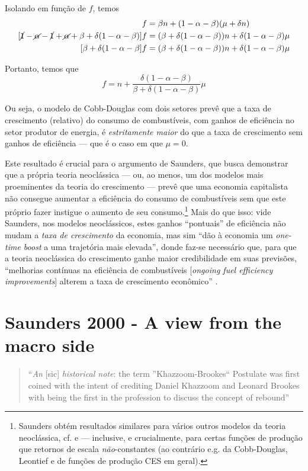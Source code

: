 Isolando em função de $f$, temos
\begin{align*}
[1 - \alpha - (1-\alpha-\beta)(1-\delta) ] f &= \beta n + (1-\alpha-\beta) (\mu + \delta n) \\
[\cancel{ 1 }-\cancel{ \alpha } - \cancel{ 1 }+\cancel{ \alpha }+\beta + \delta(1-\alpha-\beta)] f &= (\beta + \delta(1-\alpha-\beta)) n + \delta(1-\alpha-\beta) \mu \\
[\beta+\delta(1-\alpha-\beta] f &= (\beta + \delta(1-\alpha-\beta)) n + \delta(1-\alpha-\beta) \mu
\end{align*}

Portanto, temos que 
$$
f = n + \frac{\delta (1-\alpha-\beta)}{\beta+\delta(1-\alpha-\beta)} \mu
$$

Ou seja, o modelo de Cobb-Douglas com dois setores prevê que a taxa de crescimento (relativo) do consumo de combustíveis, com ganhos de eficiência no setor produtor de energia, é \textit{estritamente maior} do que a taxa de crescimento sem ganhos de eficiência — que é o caso em que $\mu=0$. 

Este resultado é crucial para o argumento de Saunders, que busca demonstrar que a própria teoria neoclássica — ou, ao menos, um dos modelos mais proeminentes da teoria do crescimento — prevê que uma economia capitalista não consegue aumentar a eficiência do consumo de combustíveis sem que este próprio fazer instigue o aumento de seu consumo.\footnote{Saunders obtém resultados similares para vários outros modelos da teoria neoclássica, cf. \textcite{Saunders2000} e \textcite{Saunders2008} — inclusive, e crucialmente, para certas funções de produção que retornos de escala \textit{não}-constantes (ao contrário e.g. da Cobb-Douglas, Leontief e de funções de produção CES em geral).} Mais do que isso: vide Saunders, nos modelos neoclássicos, estes ganhos ``pontuais'' de eficiência não mudam a \textit{taxa de crescimento} da economia, mas sim ``dão à economia um \textit{one-time boost} a uma trajetória mais elevada'', donde faz-se necessário que, para que a teoria neoclássica do crescimento ganhe maior credibilidade em suas previsões, ``melhorias contínuas na eficiência de combustíveis [\textit{ongoing fuel efficiency improvements}] alterem a taxa de crescimento econômico'' \parencite[p. 444]{Saunders2000}.

\section{Saunders 2000 - A view from the macro side}
\begin{quote}
``\textit{An} [sic] \textit{historical note}: the term ''Khazzoom-Brookes`` Postulate was first coined with the intent of crediting Daniel Khazzoom and Leonard Brookes with being the first in the profession to discuss the concept of rebound'' \parencite[p. 440]{Saunders2000}
\end{quote}

